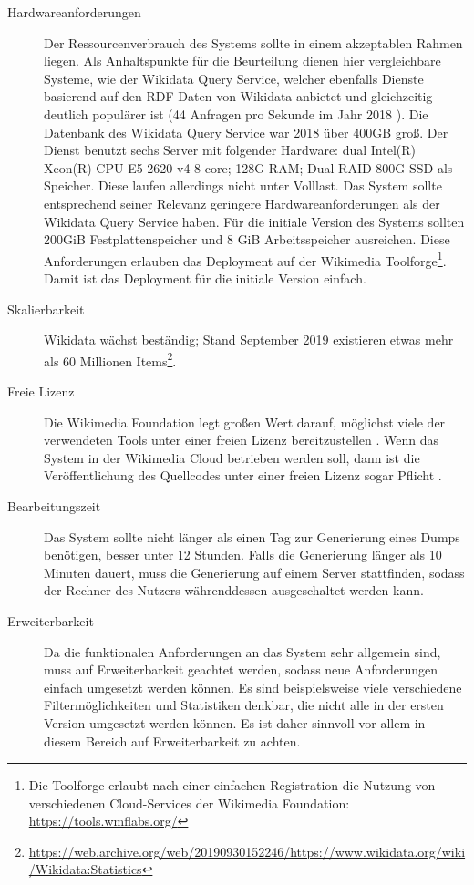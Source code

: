 \begin{description}
\item[Hardwareanforderungen] Der Ressourcenverbrauch des Systems sollte in einem akzeptablen Rahmen liegen.
    Als Anhaltspunkte für die Beurteilung dienen hier vergleichbare Systeme, wie der Wikidata Query Service, welcher ebenfalls Dienste basierend auf den RDF-Daten von Wikidata anbietet und gleichzeitig deutlich populärer ist (44 Anfragen pro Sekunde im Jahr 2018 \cite{wd-sparql}). Die Datenbank des Wikidata Query Service war 2018 über 400GB groß. Der Dienst benutzt sechs Server mit folgender Hardware: dual Intel(R) Xeon(R) CPU E5-2620 v4 8 core; 128G RAM; Dual RAID 800G SSD als Speicher. Diese laufen allerdings nicht unter Volllast.
    Das System sollte entsprechend seiner Relevanz geringere Hardwareanforderungen als der Wikidata Query Service haben. Für die initiale Version des Systems sollten 200GiB Festplattenspeicher und 8 GiB Arbeitsspeicher ausreichen. Diese Anforderungen erlauben das Deployment auf der Wikimedia Toolforge\footnote{Die Toolforge erlaubt nach einer einfachen Registration die Nutzung von verschiedenen Cloud-Services der Wikimedia Foundation: \url{https://tools.wmflabs.org/}}. Damit ist das Deployment für die initiale Version einfach.
\item[Skalierbarkeit] Wikidata wächst beständig; Stand September 2019 existieren etwas mehr als 60 Millionen Items\footnote{\url{https://web.archive.org/web/20190930152246/https://www.wikidata.org/wiki/Wikidata:Statistics}}.
\item[Freie Lizenz] Die Wikimedia Foundation legt großen Wert darauf, möglichst viele der verwendeten Tools unter einer freien Lizenz bereitzustellen \cite{wikimedia-guiding-principles}.
  Wenn das System in der Wikimedia Cloud betrieben werden soll, dann ist die Veröffentlichung des Quellcodes unter einer freien Lizenz sogar Pflicht \cite{wikimedia-cloud-tos}.
\item[Bearbeitungszeit] Das System sollte nicht länger als einen Tag zur Generierung eines Dumps benötigen, besser unter 12 Stunden. Falls die Generierung länger als 10 Minuten dauert, muss die Generierung auf einem Server stattfinden, sodass der Rechner des Nutzers währenddessen ausgeschaltet werden kann.
\item[Erweiterbarkeit] Da die funktionalen Anforderungen an das System sehr allgemein sind, muss auf Erweiterbarkeit geachtet werden, sodass neue Anforderungen einfach umgesetzt werden können. Es sind beispielsweise viele verschiedene Filtermöglichkeiten und Statistiken denkbar, die nicht alle in der ersten Version umgesetzt werden können. Es ist daher sinnvoll vor allem in diesem Bereich auf Erweiterbarkeit zu achten.

\end{description}
